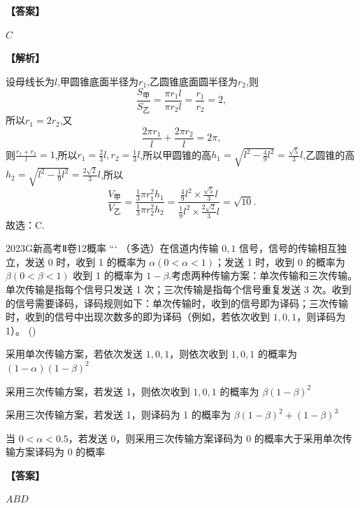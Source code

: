\documentclass{exam-zh}
\newenvironment{answer}{\par\vspace{0.5em}\noindent\textbf{【答案】}\par}{\par\vspace{1em}}
\newenvironment{solutions}{\par\vspace{0.5em}\noindent\textbf{【解析】}\par}{\par\vspace{1em}}\usepackage{lastpage}
\begin{document}
\begin{answer}
$C$
\end{answer}

\begin{solutions}
设母线长为$l$,甲圆锥底面半径为$r_1$,乙圆锥底面圆半径为$r_2$,则
$$
\frac{S_{\text{甲}}}{S_{\text{乙}}} = \frac{\pi r_1 l}{\pi r_2 l} = \frac{r_1}{r_2} = 2,
$$
所以$r_1 = 2r_2$,又
$$
\frac{2\pi r_1}{l} + \frac{2\pi r_2}{l} = 2\pi,
$$
则$\frac{r_1 + r_2}{l} = 1$,所以$r_1 = \frac{2}{3}l, r_2 = \frac{1}{3}l$,所以甲圆锥的高$h_1 = \sqrt{l^2 - \frac{4}{9}l^2} = \frac{\sqrt{5}}{3}l$,乙圆锥的高$h_2 = \sqrt{l^2 - \frac{1}{9}l^2} = \frac{2\sqrt{2}}{3}l$,所以
$$
\frac{V_{\text{甲}}}{V_{\text{乙}}} = \frac{\frac{1}{3}\pi r_1^2 h_1}{\frac{1}{3}\pi r_2^2 h_2} = \frac{\frac{4}{9}l^2 \times \frac{\sqrt{5}}{3}l}{\frac{1}{9}l^2 \times \frac{2\sqrt{2}}{3}l} = \sqrt{10}.
$$
故选：C.
\end{solutions}


\begin{question}{2023}{G}{新高考Ⅱ卷}{12}{概率}
```
（多选）在信道内传输 $0,1$ 信号，信号的传输相互独立，发送 0 时，收到 1 的概率为 $\alpha(0<\alpha<1)$；发送 1 时，收到 0 的概率为 $\beta(0<\beta<1)$ 收到 1 的概率为 $1-\beta$.考虑两种传输方案：单次传输和三次传输。单次传输是指每个信号只发送 1 次；三次传输是指每个信号重复发送 3 次。收到的信号需要译码，译码规则如下：单次传输时，收到的信号即为译码；三次传输时，收到的信号中出现次数多的即为译码（例如，若依次收到 $1,0,1$，则译码为 1）。 (\hspace{1cm})
\begin{choices}
\item 采用单次传输方案，若依次发送 $1,0,1$，则依次收到 $1,0,1$ 的概率为 $(1-\alpha)(1-\beta)^{2}$
\item 采用三次传输方案，若发送 1，则依次收到 $1,0,1$ 的概率为 $\beta(1-\beta)^{2}$
\item 采用三次传输方案，若发送 1，则译码为 1 的概率为 $\beta(1-\beta)^{2}+(1-\beta)^{3}$
\item 当 $0<\alpha<0.5$，若发送 0，则采用三次传输方案译码为 0 的概率大于采用单次传输方案译码为 0 的概率
\end{choices}
\end{question}

\begin{answer}
$ABD$
\end{answer}
\end{document}
